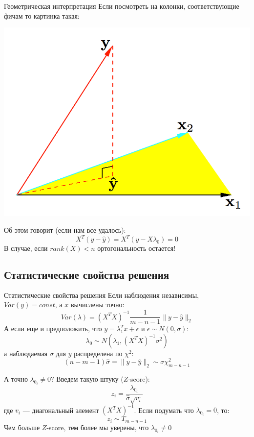 \documentclass[14pt, fleqn, xcolor={dvipsnames, table}]{beamer}
\begin{document}
\begin{frame}{Геометрическая интерпретация}
\small
Если посмотреть на колонки, соответствующие фичам то картинка такая:
\begin{center}
\includegraphics[height=0.4\textheight]{3_2.png}
\end{center}
Об этом говорит (если нам все удалось):
$$
X^T(y - \hat{y}) = X^T(y - X\lambda_0) = 0
$$
В случае, если $rank(X) < n$ ортогональность остается!
\end{frame}

\subsection{Статистические свойства решения}
\begin{frame}{Статистические свойства решения}
Если наблюдения независимы, $Var(y) = const$, а $x$ вычислены точно:
$$
Var(\lambda) = \left(X^TX\right)^{-1}\frac{1}{m - n - 1}\|y - \hat{y}\|_2
$$
А если еще и предположить, что $y=\lambda_1^Tx + \epsilon$ и $\epsilon \sim N(0,\sigma)$:
$$
\lambda_0 \sim N(\lambda_1, \left(X^TX\right)^{-1}\sigma^2)
$$
а наблюдаемая $\sigma$ для $y$ распределена по $\chi^2$:
$$
(n-m-1)\hat{\sigma} = \|y - \hat{y}\|_2 \sim \sigma \chi^2_{m-n-1}
$$
\end{frame}

\begin{frame}{А точно $\lambda_{0_i} \ne 0$?}
Введем такую штуку ($Z$-score):
$$
z_i = \frac{\lambda_{0_i}}{\hat{\sigma}\sqrt{v_i}}
$$
где $v_i$ --- диагональный элемент $\left(X^TX\right)^{-1}$. Если подумать что $\lambda_{0_i} = 0$, то:
$$
z_i \sim T_{m-n-1}
$$
Чем больше $Z$-score, тем более мы уверены, что $\lambda_{0_i} \ne 0$
\end{frame}
\end{document}
